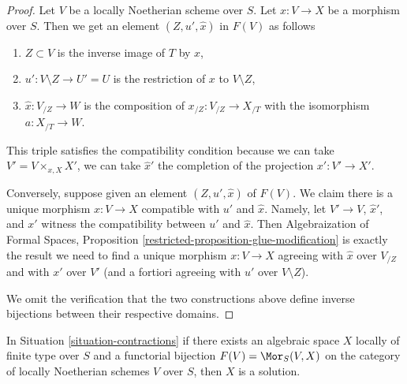 \begin{proof}
Let $V$ be a locally Noetherian scheme over $S$.
Let $x : V \to X$ be a morphism over $S$.
Then we get an element $(Z, u', \hat x)$ in $F(V)$ as follows
\begin{enumerate}
\item $Z \subset V$ is the inverse image of $T$ by $x$,
\item $u' : V \setminus Z \to U' = U$ is the restriction of
$x$ to $V \setminus Z$,
\item $\hat x : V_{/Z} \to W$ is the composition of
$x_{/Z} : V_{/Z} \to X_{/T}$ with the isomorphism $a : X_{/T} \to W$.
\end{enumerate}
This triple satisfies the compatibility condition because we
can take $V' = V \times_{x, X} X'$, we can take $\hat x'$
the completion of the projection $x' : V' \to X'$.

\medskip\noindent
Conversely, suppose given an element $(Z, u', \hat x)$ of $F(V)$. We claim
there is a unique morphism $x : V \to X$ compatible with $u'$ and $\hat x$.
Namely, let $V' \to V$, $\hat x'$, and $x'$ witness the
compatibility between $u'$ and $\hat x$. Then
Algebraization of Formal Spaces, Proposition
\ref{restricted-proposition-glue-modification}
is exactly the result we need to find
a unique morphism $x : V \to X$ agreeing with
$\hat x$ over $V_{/Z}$ and with $x'$ over $V'$ (and a fortiori
agreeing with $u'$ over $V \setminus Z$).

\medskip\noindent
We omit the verification that the two constructions above define inverse
bijections between their respective domains.
\end{proof}

\begin{lemma}
\label{lemma-functor-is-solution}
In Situation \ref{situation-contractions} if there exists an
algebraic space $X$ locally of finite type over $S$ and a
functorial bijection $F(V) = \Mor_S(V, X)$ on the category of
locally Noetherian schemes $V$ over $S$, then $X$ is a solution.
\end{lemma}

